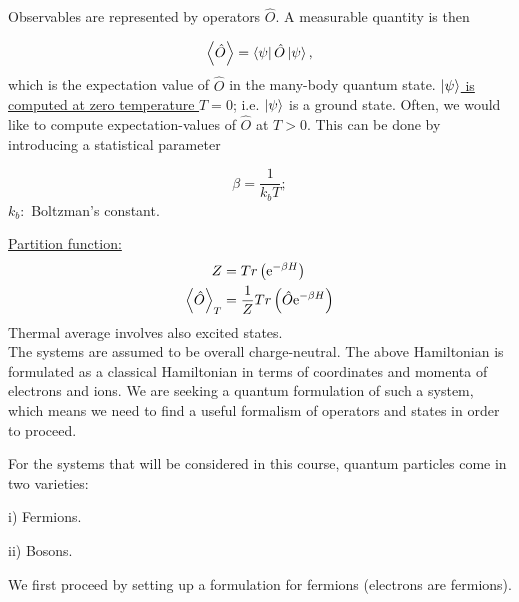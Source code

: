 \noindent Observables are represented by operators $\hat{O}$. A measurable quantity is then 

\begin{equation}
	\expval{\hat{O}} = \bra{\psi} \hat{O} \ket{\psi},
\end{equation}
which is the expectation value of $\hat{O}$ in the many-body quantum state. \uline{$\ket{\psi}$ is computed at zero temperature $T=0$}; i.e. $\ket{\psi}$ is a ground state. Often, we would like to compute expectation-values of $\hat{O}$ at $T>0$. This can be done by introducing a statistical parameter 

\begin{equation}
	\beta = \frac{1}{k_b T};
\end{equation}
$k_b:$ Boltzman's constant.\\
\linebreak

\noindent \uline{Partition function:}
\begin{align}
	Z &= Tr \left(\mathrm{e}^{-\beta H} \right)\\
	\expval{\hat{O}}_T &= \frac{1}{Z} Tr \left(\hat{O} \mathrm{e}^{-\beta H} \right)
\end{align}
Thermal average involves also excited states.\\
\linebreak
\noindent The systems are assumed to be overall charge-neutral. 
The above Hamiltonian is formulated as a classical Hamiltonian in terms of coordinates and momenta of electrons and ions.
We are seeking a quantum formulation of such a system, which means we need to find a useful formalism of operators and states in order to proceed.\\
\linebreak

\noindent For the systems that will be considered in this course, quantum particles come in two varieties:

i) Fermions.

ii) Bosons.

\noindent We first proceed by setting up a formulation for fermions (electrons are fermions).

























